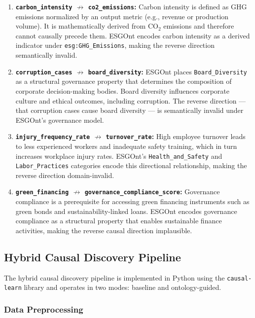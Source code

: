 \documentclass[a4paper,11pt,oneside]{article}
\begin{document}
\begin{enumerate}
    \item \textbf{\texttt{carbon\_intensity} $\not\rightarrow$ \texttt{co2\_emissions}:} Carbon intensity is defined as GHG emissions normalized by an output metric (e.g., revenue or production volume). It is mathematically derived from CO$_2$ emissions and therefore cannot causally precede them. ESGOnt encodes carbon intensity as a derived indicator under \texttt{esg:GHG\_Emissions}, making the reverse direction semantically invalid.

    \item \textbf{\texttt{corruption\_cases} $\not\rightarrow$ \texttt{board\_diversity}:} ESGOnt places \texttt{Board\_Diversity} as a structural governance property that determines the composition of corporate decision-making bodies. Board diversity influences corporate culture and ethical outcomes, including corruption. The reverse direction — that corruption cases cause board diversity — is semantically invalid under ESGOnt's governance model.

    \item \textbf{\texttt{injury\_frequency\_rate} $\not\rightarrow$ \texttt{turnover\_rate}:} High employee turnover leads to less experienced workers and inadequate safety training, which in turn increases workplace injury rates. ESGOnt's \texttt{Health\_and\_Safety} and \texttt{Labor\_Practices} categories encode this directional relationship, making the reverse direction domain-invalid.

    \item \textbf{\texttt{green\_financing} $\not\rightarrow$ \texttt{governance\_compliance\_score}:} Governance compliance is a prerequisite for accessing green financing instruments such as green bonds and sustainability-linked loans. ESGOnt encodes governance compliance as a structural property that enables sustainable finance activities, making the reverse causal direction implausible.
\end{enumerate}

\subsection{Hybrid Causal Discovery Pipeline}

The hybrid causal discovery pipeline is implemented in Python using the \texttt{causal-learn} library and operates in two modes: baseline and ontology-guided.

\subsubsection{Data Preprocessing}
\end{document}
